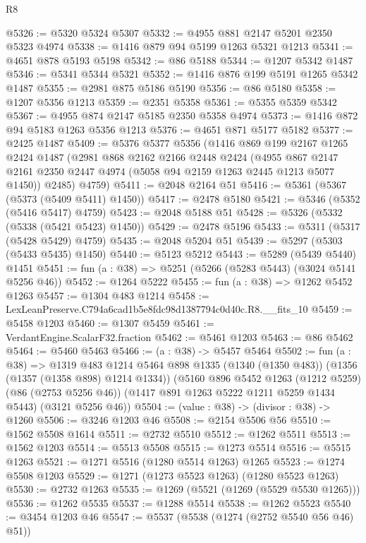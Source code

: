 \begin{lexlean}{R8}
\begin{coremodule}
@5326 := @5320 @5324 @5307
@5332 := @4955 @881 @2147 @5201 @2350 @5323 @4974
@5338 := @1416 @879 @94 @5199 @1263 @5321 @1213
@5341 := @4651 @878 @5193 @5198
@5342 := @86 @5188
@5344 := @1207 @5342 @1487
@5346 := @5341 @5344 @5321
@5352 := @1416 @876 @199 @5191 @1265 @5342 @1487
@5355 := @2981 @875 @5186 @5190
@5356 := @86 @5180
@5358 := @1207 @5356 @1213
@5359 := @2351 @5358
@5361 := @5355 @5359 @5342
@5367 := @4955 @874 @2147 @5185 @2350 @5358 @4974
@5373 := @1416 @872 @94 @5183 @1263 @5356 @1213
@5376 := @4651 @871 @5177 @5182
@5377 := @2425 @1487
@5409 := @5376
    @5377
    @5356
    (@1416
      @869
      @199
      @2167
      @1265
      @2424
      @1487
      (@2981
        @868
        @2162
        @2166
        @2448
        @2424
        (@4955 @867 @2147 @2161 @2350 @2447 @4974 (@5058 @94 @2159 @1263 @2445 @1213 @5077 @1450))
        @2485)
      @4759)
@5411 := @2048 @2164 @51
@5416 := @5361 (@5367 (@5373 (@5409 @5411) @1450))
@5417 := @2478 @5180
@5421 := @5346 (@5352 (@5416 @5417) @4759)
@5423 := @2048 @5188 @51
@5428 := @5326 (@5332 (@5338 (@5421 @5423) @1450))
@5429 := @2478 @5196
@5433 := @5311 (@5317 (@5428 @5429) @4759)
@5435 := @2048 @5204 @51
@5439 := @5297 (@5303 (@5433 @5435) @1450)
@5440 := @5123 @5212
@5443 := @5289 (@5439 @5440) @1451
@5451 := fun (a : @38) => @5251 (@5266 (@5283 @5443) (@3024 @5141 @5256 @46))
@5452 := @1264 @5222
@5455 := fun (a : @38) => @1262 @5452 @1263
@5457 := @1304 @483 @1214
@5458 := LexLeanPreserve.C794a6cad1b5e8fdc98d1387794c0d40c.R8.__fits_10
@5459 := @5458 @1203
@5460 := @1307 @5459
@5461 := VerdantEngine.ScalarF32.fraction
@5462 := @5461 @1203
@5463 := @86 @5462
@5464 := @5460 @5463
@5466 := (a : @38) -> @5457 @5464
@5502 := fun (a : @38) =>
  @1319
    @483
    @1214
    @5464
    @898
    @1335
    (@1340 (@1350 @483))
    (@1356 (@1357 (@1358 @898) @1214 @1334))
    (@5160
      @896
      @5452
      @1263
      (@1212 @5259)
      (@86 (@2753 @5256 @46))
      (@1417 @891 @1263 @5222 @1211 @5259 @1434 @5443)
      (@3121 @5256 @46))
@5504 := (value : @38) -> (divisor : @38) -> @1260
@5506 := @3246 @1203 @46
@5508 := @2154 @5506 @56
@5510 := @1562 @5508 @1614
@5511 := @2732 @5510
@5512 := @1262 @5511
@5513 := @1562 @1203
@5514 := @5513 @5508
@5515 := @1273 @5514
@5516 := @5515 @1263
@5521 := @1271 @5516 (@1280 @5514 @1263) @1265
@5523 := @1274 @5508 @1203
@5529 := @1271 (@1273 @5523 @1263) (@1280 @5523 @1263)
@5530 := @2732 @1263
@5535 := @1269 (@5521 (@1269 (@5529 @5530 @1265)))
@5536 := @1262 @5535
@5537 := @1288 @5514
@5538 := @1262 @5523
@5540 := @3454 @1203 @46
@5547 := @5537 (@5538 (@1274 (@2752 @5540 @56 @46) @51))

\end{coremodule}
\end{lexlean}
